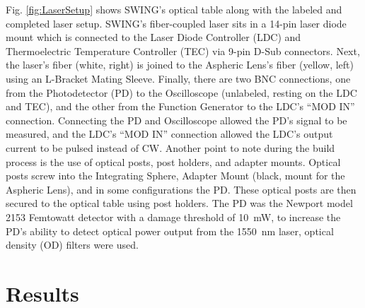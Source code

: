 \documentclass[journal,twoside,web]{ieeecolor}
\begin{document}
Fig. \ref{fig:LaserSetup} shows SWING's optical table along with the labeled and completed laser setup. SWING's fiber-coupled laser sits in a 14-pin laser diode 
mount which is connected to the Laser Diode Controller (LDC) and Thermoelectric Temperature Controller (TEC) via 9-pin D-Sub connectors. Next, the laser's fiber 
(white, right) is joined to the Aspheric Lens's fiber (yellow, left) using an L-Bracket Mating Sleeve. Finally, there are two BNC connections, one from the Photodetector (PD) to 
the Oscilloscope (unlabeled, resting on the LDC and TEC), and the other from the Function Generator to the LDC's “MOD IN” connection. Connecting the PD and Oscilloscope allowed 
the PD's signal to be measured, and the LDC's “MOD IN” connection allowed the LDC's output current to be pulsed instead of CW. Another point to note during the build process is the use of optical 
posts, post holders, and adapter mounts. Optical posts screw into the Integrating Sphere, Adapter Mount (black, mount for the Aspheric Lens), and in some configurations the PD. 
These optical posts are then secured to the optical table using post holders. The PD was the Newport model 2153 Femtowatt detector with a damage threshold of \SI{10}{\milli\watt}, 
to increase the PD's ability to detect optical power output from the 1550~nm laser, optical density (OD) filters were used.

\section{Results}
\end{document}
